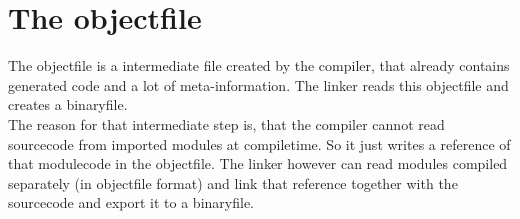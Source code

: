 \section{The objectfile}
The objectfile is a intermediate file created by the compiler, that already
contains generated code and a lot of meta-information. The linker reads this
objectfile and creates a binaryfile. \\
The reason for that intermediate step is, that the compiler cannot read sourcecode
from imported modules at compiletime. So it just writes a reference of that modulecode
in the objectfile. The linker however can read modules compiled separately (in
objectfile format) and link that reference together with the sourcecode and
export it to a binaryfile.
